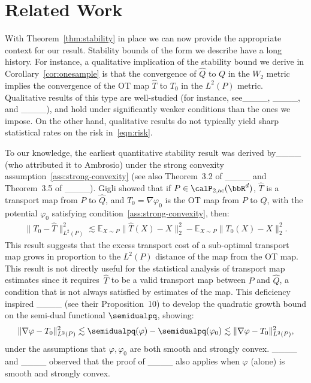 \section{Related Work}
With Theorem~\ref{thm:stability} in place we can now provide the appropriate context for our result. 
Stability bounds of the form we describe have a long history. For instance, a qualitative implication of the stability bound we derive in Corollary~\ref{cor:onesample} is that   the convergence of $\widehat{Q}$ to $Q$ in the $W_2$ metric implies the convergence of the OT map $\widehat{T}$ to $T_0$ in the $L^2(P)$ metric.
Qualitative results of this type are well-studied (for instance, see____, 
____,
and
____), and hold under significantly weaker conditions than the ones we impose. On the other hand, qualitative results do not typically yield sharp statistical rates on the risk in~\eqref{eqn:risk}.

To our knowledge, 
the earliest quantitative stability result
was derived by____
(who attributed it to Ambrosio)
 under the strong 
convexity 
assumption~\ref{ass:strong-convexity}
(see also Theorem~3.2 of ____ and Theorem~3.5 of
____).
Gigli showed that if  
$P\in \calP_{2,\mathrm{ac}}(\bbR^d)$, $\hat T$ is a   transport map from $P$ to $\hat Q$,
and $T_0=\nabla\varphi_0$ is the OT map from $P$ to $Q$, with the potential $\varphi_0$ satisfying condition~\ref{ass:strong-convexity}, then:
\begin{align*}
    \|T_0 - \hat T\|_{L^2(P)}^2 \lesssim \mathbb{E}_{X\sim P}\|\hat T(X) - X\|_2^2 - \mathbb{E}_{X \sim P} \|T_0(X) - X\|_2^2.
\end{align*}
This result suggests that the excess transport cost of a sub-optimal transport map grows in proportion to the $L^2(P)$ distance of the map from the OT map. This result is not directly useful for the statistical analysis of transport map estimates since it requires~$\hat T$ to be a valid transport map between $P$ and $\hat Q$, a condition that is not always satisfied by estimates of the map.
This deficiency inspired ____ (see their Proposition~10) to develop the quadratic growth bound on the semi-dual functional $\semidualpq$, showing:
\begin{align*}
 \|\nabla \varphi - T_0\|_{L^2(P)}^2 \lesssim \semidualpq(\varphi) - \semidualpq(\varphi_0) \lesssim \|\nabla \varphi - T_0\|_{L^2(P)}^2,
\end{align*}
under the assumptions that $\varphi, \varphi_0$ are both smooth and strongly convex. ____ and ____ 
observed that the proof of ____ also applies when $\varphi$ (alone) is smooth and strongly convex.
 
